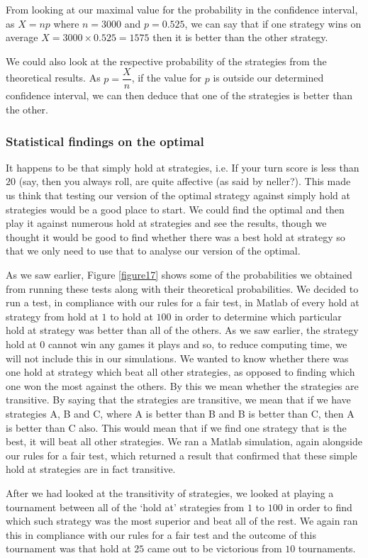 \documentclass[a4paper,titlepage]{article}
\begin{document}
From looking at our maximal value for the probability in the confidence interval, as $X=np$ where $n=3000$ and $p=0.525$, we can say that if one strategy wins on average $X=3000\times0.525=1575$ then it is better than the other strategy.

We could also look at the respective probability of the strategies from the theoretical results.  As $p=\dfrac{X}{n}$, if the value for $p$ is outside our determined confidence interval, we can then deduce that one of the strategies is better than the other.
\subsubsection{Statistical findings on the optimal}
It happens to be that simply hold at strategies, i.e. If your turn score is less than $20$ (say, then you always roll, are quite affective (as said by neller?). This made us think that testing our version of the optimal strategy against simply hold at strategies would be a good place to start. We could find the optimal and then play it against numerous hold at strategies and see the results, though we thought it would be good to find whether there was a best hold at strategy so that we only need to use that to analyse our version of the optimal.

As we saw earlier, Figure \ref{figure17} shows some of the probabilities we obtained from running these tests along with their theoretical probabilities. We decided to run a test, in compliance with our rules for a fair test, in Matlab of every hold at strategy from hold at $1$ to hold at $100$ in order to determine which particular hold at strategy was better than all of the others. As we saw earlier, the strategy hold at $0$ cannot win any games it plays and so, to reduce computing time, we will not include this in our simulations. We wanted to know whether there was one hold at strategy which beat all other strategies, as opposed to finding which one won the most against the others. By this we mean whether the strategies are transitive. By saying that the strategies are transitive, we mean that if we have strategies A, B and C, where A is better than B and B is better than C, then A is better than C also. This would mean that if we find one strategy that is the best, it will beat all other strategies. We ran a Matlab simulation, again alongside our rules for a fair test, which returned a result that confirmed that these simple hold at strategies are in fact transitive.

After we had looked at the transitivity of strategies, we looked at playing a tournament between all of the ‘hold at’ strategies from $1$ to $100$ in order to find which such strategy was the most superior and beat all of the rest. We again ran this in compliance with our rules for a fair test and the outcome of this tournament was that hold at $25$ came out to be victorious from $10$ tournaments.
\end{document}
